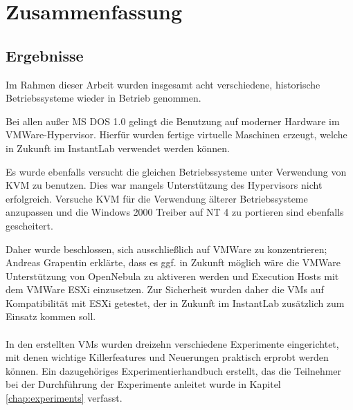 \chapter{Zusammenfassung}
\label{chap:evaluation}


\section{Ergebnisse}
\label{sec:results}

	Im Rahmen dieser Arbeit wurden insgesamt acht verschiedene, historische Betriebssysteme wieder in Betrieb genommen.

	Bei allen außer MS DOS 1.0 gelingt die Benutzung auf moderner Hardware im VMWare-Hypervisor.
	Hierfür wurden fertige virtuelle Maschinen erzeugt, welche in Zukunft im InstantLab verwendet werden können.

	Es wurde ebenfalls versucht die gleichen Betriebssysteme unter Verwendung von KVM zu benutzen.
	Dies war mangels Unterstützung des Hypervisors nicht erfolgreich.
	Versuche KVM für die Verwendung älterer Betriebssysteme anzupassen und die Windows 2000 Treiber auf NT 4 zu portieren sind ebenfalls gescheitert.

	Daher wurde beschlossen, sich ausschließlich auf VMWare zu konzentrieren; 
	Andreas Grapentin erklärte, dass es ggf. in Zukunft möglich wäre die VMWare Unterstützung von OpenNebula zu aktiveren werden und Execution Hosts mit dem VMWare ESXi einzusetzen.
	Zur Sicherheit wurden daher die VMs auf Kompatibilität mit ESXi getestet, der in Zukunft im InstantLab zusätzlich zum Einsatz kommen soll. \\ \\

	In den erstellten VMs wurden dreizehn verschiedene Experimente eingerichtet, mit denen wichtige Killerfeatures und Neuerungen praktisch erprobt werden können.
	Ein dazugehöriges Experimentierhandbuch erstellt, das die Teilnehmer bei der Durchführung der Experimente anleitet wurde in Kapitel \ref{chap:experiments} verfasst.



		

